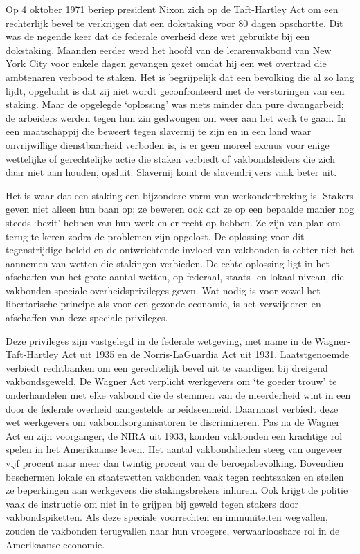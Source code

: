 \documentclass[
  a5paper,
  smalldemyvopaper,10pt,twoside,onecolumn,openright,extrafontsizes,hidelinks]{memoir}
\begin{document}
Op 4 oktober 1971 beriep president Nixon zich op de Taft-Hartley Act om
een rechterlijk bevel te verkrijgen dat een dokstaking voor 80 dagen
opschortte. Dit was de negende keer dat de federale overheid deze wet
gebruikte bij een dokstaking. Maanden eerder werd het hoofd van de
lerarenvakbond van New York City voor enkele dagen gevangen gezet omdat
hij een wet overtrad die ambtenaren verbood te staken. Het is
begrijpelijk dat een bevolking die al zo lang lijdt, opgelucht is dat
zij niet wordt geconfronteerd met de verstoringen van een staking. Maar
de opgelegde `oplossing' was niets minder dan pure dwangarbeid; de
arbeiders werden tegen hun zin gedwongen om weer aan het werk te gaan.
In een maatschappij die beweert tegen slavernij te zijn en in een land
waar onvrijwillige dienstbaarheid verboden is, is er geen moreel excuus
voor enige wettelijke of gerechtelijke actie die staken verbiedt of
vakbondsleiders die zich daar niet aan houden, opsluit. Slavernij komt
de slavendrijvers vaak beter uit.

Het is waar dat een staking een bijzondere vorm van werkonderbreking is.
Stakers geven niet alleen hun baan op; ze beweren ook dat ze op een
bepaalde manier nog steeds `bezit' hebben van hun werk en er recht op
hebben. Ze zijn van plan om terug te keren zodra de problemen zijn
opgelost. De oplossing voor dit tegenstrijdige beleid en de
ontwrichtende invloed van vakbonden is echter niet het aannemen van
wetten die stakingen verbieden. De echte oplossing ligt in het
afschaffen van het grote aantal wetten, op federaal, staats- en lokaal
niveau, die vakbonden speciale overheidsprivileges geven. Wat nodig is
voor zowel het libertarische principe als voor een gezonde economie, is
het verwijderen en afschaffen van deze speciale privileges.

Deze privileges zijn vastgelegd in de federale wetgeving, met name in de
Wagner-Taft-Hartley Act uit 1935 en de Norris-LaGuardia Act uit 1931.
Laatstgenoemde verbiedt rechtbanken om een gerechtelijk bevel uit te
vaardigen bij dreigend vakbondsgeweld. De Wagner Act verplicht
werkgevers om `te goeder trouw' te onderhandelen met elke vakbond die de
stemmen van de meerderheid wint in een door de federale overheid
aangestelde arbeidseenheid. Daarnaast verbiedt deze wet werkgevers om
vakbondsorganisatoren te discrimineren. Pas na de Wagner Act en zijn
voorganger, de NIRA uit 1933, konden vakbonden een krachtige rol spelen
in het Amerikaanse leven. Het aantal vakbondslieden steeg van ongeveer
vijf procent naar meer dan twintig procent van de beroepsbevolking.
Bovendien beschermen lokale en staatswetten vakbonden vaak tegen
rechtszaken en stellen ze beperkingen aan werkgevers die stakingsbrekers
inhuren. Ook krijgt de politie vaak de instructie om niet in te grijpen
bij geweld tegen stakers door vakbondspiketten. Als deze speciale
voorrechten en immuniteiten wegvallen, zouden de vakbonden terugvallen
naar hun vroegere, verwaarloosbare rol in de Amerikaanse economie.
\end{document}
